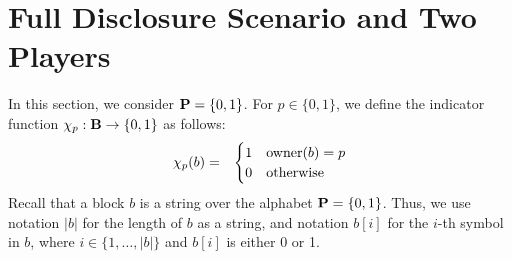 

\section{Full Disclosure Scenario and Two Players}
\label{sec-fd&2p}
In this section, we consider $\mathbf{P} = \{0,1\}$. For $p \in \{0,1\}$, we define the indicator  function $\chi_p : \mathbf{B} \to \{0,1\}$ as follows:
\begin{eqnarray*}
\chi_p(b) & = & 
\begin{cases}
1 & \text{\rm owner}(b) = p\\
0 & \text{otherwise}
\end{cases}
\end{eqnarray*}
Recall that a block $b$ is a string over the alphabet $\mathbf{P} = \{0,1\}$. Thus, we use notation $|b|$ for the length of $b$ as a string, and notation $b[i]$ for the $i$-th symbol in $b$, where $i \in \{1, \ldots, |b|\}$ and $b[i]$ is either 0 or 1. 

 

